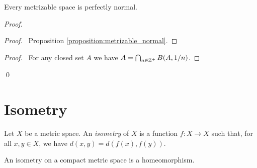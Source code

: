 \begin{proposition}
    Every metrizable space is perfectly normal.
\end{proposition}

\begin{proof}
    \pf
    \begin{proof}
        \pf\ Proposition \ref{proposition:metrizable_normal}.
    \end{proof}
    \begin{proof}
        \pf\ For any closed set $A$ we have $A = \bigcap_{n \in \mathbb{Z}^+}
        B(A,1/n)$.
    \end{proof}
    \qed
\end{proof}

\section{Isometry}

\begin{definition}[Isometry]
    Let $X$ be a metric space. An \emph{isometry} of $X$ is a function
    $f : X \rightarrow X$ such that, for all $x, y \in X$, we have
    $d(x,y) = d(f(x),f(y))$.    
\end{definition}

\begin{proposition}
    An isometry on a compact metric space is a homeomorphism.
\end{proposition}


